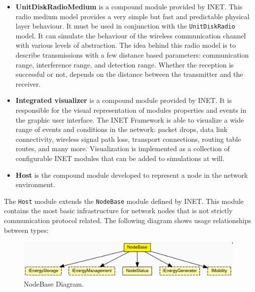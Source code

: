 \begin{itemize}
    \item \textbf{UnitDiskRadioMedium} is a compound module provided by INET.
    This radio medium model provides a very simple but fast and predictable
    physical layer behaviour. It must be used in conjunction with the
    \texttt{UnitDiskRadio} model. It can simulate the behaviour of the wireless
    communication channel with various levels of abstraction. The idea behind
	this radio model is to describe transmissions with a few distance based
	parameters: communication range, interference range, and detection range.
	Whether the reception is successful or not, depends on the distance between
	the transmitter and the receiver.
    \item \textbf{Integrated visualizer} is a compound module provided by INET.
    It is responsible for the visual representation of modules properties and
    events in the graphic user interface. The INET Framework is able to visualize
	a wide range of events and conditions in the network: packet drops, data
	link connectivity, wireless signal path loss, transport connections, routing
	table routes, and many more. Visualization is implemented as a collection
	of configurable INET modules that can be added to simulations at will.
    \item \textbf{Host} is the compound module developed to represent a node
    in the network environment.
\end{itemize}
The \texttt{Host} module extends the \texttt{NodeBase} module defined by INET. This
module contains the most basic infrastructure for network nodes that is not
strictly communication protocol related. The following diagram shows usage
relationships between types:
\begin{figure}[H]
    \begin{center}
        \includegraphics[scale=0.26]{img/nodebase.png}
        \caption{NodeBase Diagram.}
        \label{fig:nodebaseOmnet}
    \end{center}
    \vspace*{-0.8cm}
\end{figure}
